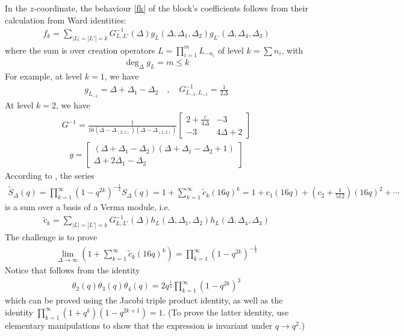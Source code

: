 \documentclass[12pt,a4paper]{article}
\begin{document}
In the $z$-coordinate, the behaviour \eqref{fk} of the block's coefficients follows from their calculation from Ward identities:
\begin{align}
 f_k = \sum_{|L|=|L'|=k} G^{-1}_{L,L'}(\Delta) g_L(\Delta,\Delta_1,\Delta_2)g_{L'}(\Delta,\Delta_4,\Delta_3)
\label{fke}
 \end{align}
where the sum is over creation operators $L=\prod_{i=1}^m L_{-n_i}$ of level $k=\sum n_i$, with 
\begin{align}
 \deg_\Delta g_L = m\leq k
\end{align}
For example, at level $k=1$, we have 
\begin{align}
 g_{L_{-1}} = \Delta + \Delta_1-\Delta_2 \quad , \quad G^{-1}_{L_{-1},L_{-1}} = \frac{1}{2\Delta} 
\end{align}
At level $k=2$, we have 
\begin{align}
G^{-1} = \frac{1}{16(\Delta-\Delta_{(2,1)})(\Delta-\Delta_{(1,2)})} \begin{bmatrix} 2+\frac{c}{4\Delta} & -3 \\ -3 & 4\Delta+2 \end{bmatrix}
\end{align}
\begin{align}
 g = \begin{bmatrix} (\Delta+\Delta_1-\Delta_2)(\Delta+\Delta_1-\Delta_2+1) \\ \Delta+2\Delta_1-\Delta_2 \end{bmatrix}
\end{align}
According to \cite[Eq. (7.11)]{msz15}, the series 
\begin{align}
 \widetilde{S}_\Delta(q) =  \prod_{k=1}^\infty\left(1-q^{2k}\right)^{-\frac12} S_\Delta(q)  = 1+\sum_{k=1}^\infty \tilde{c}_k (16q)^k = 1 + c_1 (16q) + \left(c_2+\tfrac{1}{512}\right) (16q)^2 + \cdots 
\end{align}
is a sum over a basis of a Verma module, i.e. 
\begin{align}
 \tilde{c}_k = \sum_{|L|=|L'|=k} G^{-1}_{L,L'}(\Delta) h_L(\Delta,\Delta_1,\Delta_2)h_L(\Delta,\Delta_4,\Delta_3)
 \label{ghh}
\end{align}
The challenge is to prove 
\begin{align}
 \lim_{\Delta\to \infty} \left(1+\sum_{k=1}^\infty \tilde{c}_k (16q)^k\right) = \prod_{k=1}^\infty\left(1-q^{2k}\right)^{-\frac12}
 \label{ltc}
\end{align}
Notice that \cite[Eq. (7.11)]{msz15} follows from the identity 
\begin{align}
 \theta_2(q)\theta_3(q)\theta_4(q) = 2q^\frac14 \prod_{k=1}^\infty (1-q^{2k})^3
\end{align}
which can be proved using the Jacobi triple product identity, as well as the identity $\prod_{k=1}^\infty (1+q^k)(1-q^{2k+1}) = 1$. (To prove the latter identity, use elementary manipulations to show that the expression is invariant under $q\to q^2$.)
\end{document}
